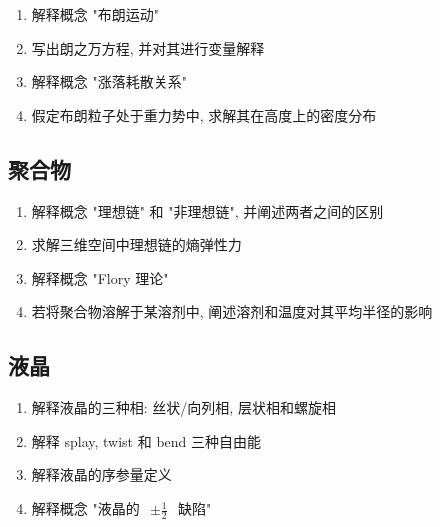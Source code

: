 \documentclass[../../main.tex]{subfiles}
\begin{document}
\begin{enumerate}
    \item 解释概念 "布朗运动"
    \item 写出朗之万方程, 并对其进行变量解释
    \item 解释概念 "涨落耗散关系"
    \item 假定布朗粒子处于重力势中, 求解其在高度上的密度分布
\end{enumerate}

\subsection{聚合物}

\begin{enumerate}
    \item 解释概念 "理想链" 和 "非理想链", 并阐述两者之间的区别
    \item 求解三维空间中理想链的熵弹性力
    \item 解释概念 "Flory 理论"
    \item 若将聚合物溶解于某溶剂中, 阐述溶剂和温度对其平均半径的影响
\end{enumerate}

\subsection{液晶}

\begin{enumerate}
    \item 解释液晶的三种相: 丝状/向列相, 层状相和螺旋相
    \item 解释 splay, twist 和 bend 三种自由能
    \item 解释液晶的序参量定义
    \item 解释概念 "液晶的 $\begin{aligned}\pm\frac{1}{2}\end{aligned}$ 缺陷"
\end{enumerate}
\end{document}
